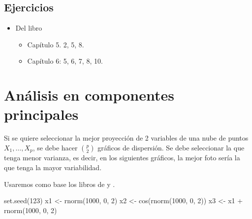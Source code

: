\documentclass[
  12pt,
]{book}
\newenvironment{Shaded}{\begin{snugshade}}{\end{snugshade}}
\newcommand{\AttributeTok}[1]{\textcolor[rgb]{0.77,0.63,0.00}{#1}}
\newcommand{\DecValTok}[1]{\textcolor[rgb]{0.00,0.00,0.81}{#1}}
\newcommand{\FunctionTok}[1]{\textcolor[rgb]{0.00,0.00,0.00}{#1}}
\newcommand{\NormalTok}[1]{#1}
\newcommand{\OtherTok}[1]{\textcolor[rgb]{0.56,0.35,0.01}{#1}}
\newcommand{\SpecialCharTok}[1]{\textcolor[rgb]{0.00,0.00,0.00}{#1}}
\newcommand{\StringTok}[1]{\textcolor[rgb]{0.31,0.60,0.02}{#1}}
\providecommand{\tightlist}{%
  \setlength{\itemsep}{0pt}\setlength{\parskip}{0pt}}
\theoremstyle{definition}
\theoremstyle{definition}
\theoremstyle{definition}
\theoremstyle{remark}
\begin{document}
\hypertarget{ejercicios-5}{%
\section{Ejercicios}\label{ejercicios-5}}

\begin{itemize}
\tightlist
\item
  Del libro \autocite{James2013b}

  \begin{itemize}
  \tightlist
  \item
    Capítulo 5. 2, 5, 8.
  \item
    Capítulo 6: 5, 6, 7, 8, 10.
  \end{itemize}
\end{itemize}

\hypertarget{anuxe1lisis-en-componentes-principales}{%
\chapter{Análisis en componentes principales}\label{anuxe1lisis-en-componentes-principales}}

Si se quiere seleccionar la mejor proyección de 2 variables de una nube de puntos \(X_1,\dots, X_p\), se debe hacer \(\binom{p}{2}\) gráficos de dispersión. Se debe seleccionar la que tenga menor varianza, es decir, en los siguientes gráficos, la mejor foto sería la que tenga la mayor variabilidad.

Usaremos como base los libros de \autocite{HussonExploratory2017} y \autocite{James2013b}.

\begin{Shaded}
\end{Shaded}

\begin{Shaded}
\begin{Highlighting}[]
\FunctionTok{set.seed}\NormalTok{(}\DecValTok{123}\NormalTok{)}
\NormalTok{x1 }\OtherTok{\textless{}{-}} \FunctionTok{rnorm}\NormalTok{(}\DecValTok{1000}\NormalTok{, }\DecValTok{0}\NormalTok{, }\DecValTok{2}\NormalTok{)}
\NormalTok{x2 }\OtherTok{\textless{}{-}} \FunctionTok{cos}\NormalTok{(}\FunctionTok{rnorm}\NormalTok{(}\DecValTok{1000}\NormalTok{, }\DecValTok{0}\NormalTok{, }\DecValTok{2}\NormalTok{))}
\NormalTok{x3 }\OtherTok{\textless{}{-}}\NormalTok{ x1 }\SpecialCharTok{+} \FunctionTok{rnorm}\NormalTok{(}\DecValTok{1000}\NormalTok{, }\DecValTok{0}\NormalTok{, }\DecValTok{2}\NormalTok{)}
\end{Highlighting}
\end{Shaded}
\end{document}
